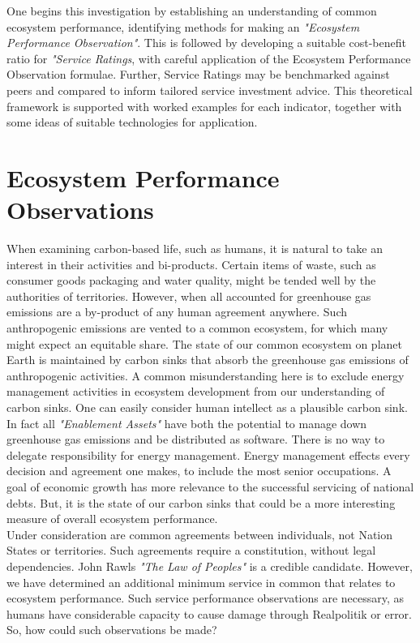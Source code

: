 \documentclass[11pt, oneside]{article}   	%
\begin{document}
One begins this investigation by establishing an understanding of common ecosystem performance, identifying methods for making an \emph{"Ecosystem Performance Observation"}.
This is followed by developing a suitable cost-benefit ratio for \emph{"Service Ratings}, with careful application of the Ecosystem Performance Observation formulae.
Further, Service Ratings may be benchmarked against peers and compared to inform tailored service investment advice.
This theoretical framework is supported with worked examples for each indicator, together with some ideas of suitable technologies for application.\\

\section{Ecosystem Performance Observations}

When examining carbon-based life, such as humans, it is natural to take an interest in their activities and bi-products.
Certain items of waste, such as consumer goods packaging and water quality, might be tended well by the authorities of territories.
However, when all accounted for greenhouse gas emissions are a by-product of any human agreement anywhere.
Such anthropogenic emissions are vented to a common ecosystem, for which many might expect an equitable share.
The state of our common ecosystem on planet Earth is maintained by carbon sinks that absorb the greenhouse gas emissions of anthropogenic activities.
A common misunderstanding here is to exclude energy management activities in ecosystem development from our understanding of carbon sinks.
One can easily consider human intellect as a plausible carbon sink.
In fact all \emph{"Enablement Assets"} have both the potential to manage down greenhouse gas emissions and be distributed as software.
There is no way to delegate responsibility for energy management.
Energy management effects every decision and agreement one makes, to include the most senior occupations.
A goal of economic growth has more relevance to the successful servicing of national debts.
But, it is the state of our carbon sinks that could be a more interesting measure of overall ecosystem performance.\\

Under consideration are common agreements between individuals, not Nation States or territories.
Such agreements require a constitution, without legal dependencies.
John Rawls \emph{"The Law of Peoples"} is a credible candidate.
However, we have determined an additional minimum service in common that relates to ecosystem performance.
Such service performance observations are necessary, as humans have considerable capacity to cause damage through Realpolitik or error.
So, how could such observations be made?
\end{document}
